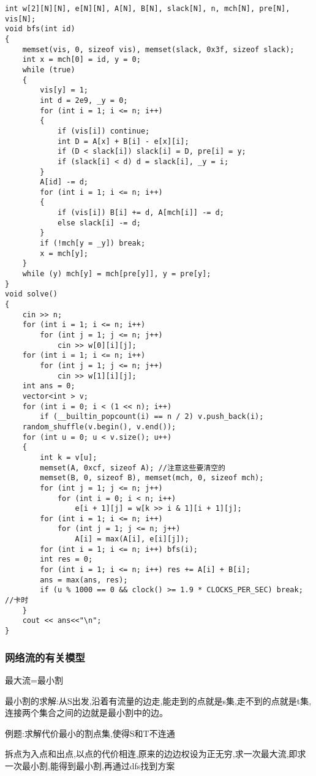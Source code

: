 \documentclass[a4paper, fontset=none]{ctexart}
\begin{document}
\begin{verbatim}
int w[2][N][N], e[N][N], A[N], B[N], slack[N], n, mch[N], pre[N], vis[N];
void bfs(int id)
{
    memset(vis, 0, sizeof vis), memset(slack, 0x3f, sizeof slack);
    int x = mch[0] = id, y = 0;
    while (true)
    {
        vis[y] = 1;
        int d = 2e9, _y = 0;
        for (int i = 1; i <= n; i++)
        {
            if (vis[i]) continue;
            int D = A[x] + B[i] - e[x][i];
            if (D < slack[i]) slack[i] = D, pre[i] = y;
            if (slack[i] < d) d = slack[i], _y = i;
        }
        A[id] -= d;
        for (int i = 1; i <= n; i++)
        {
            if (vis[i]) B[i] += d, A[mch[i]] -= d;
            else slack[i] -= d;
        }
        if (!mch[y = _y]) break;
        x = mch[y];
    }
    while (y) mch[y] = mch[pre[y]], y = pre[y];
}
void solve()
{
    cin >> n;
    for (int i = 1; i <= n; i++)
        for (int j = 1; j <= n; j++)
            cin >> w[0][i][j];
    for (int i = 1; i <= n; i++)
        for (int j = 1; j <= n; j++)
            cin >> w[1][i][j];
    int ans = 0;
    vector<int > v;
    for (int i = 0; i < (1 << n); i++)
        if (__builtin_popcount(i) == n / 2) v.push_back(i);
    random_shuffle(v.begin(), v.end());
    for (int u = 0; u < v.size(); u++)
    {
        int k = v[u];
        memset(A, 0xcf, sizeof A); //注意这些要清空的
        memset(B, 0, sizeof B), memset(mch, 0, sizeof mch);
        for (int j = 1; j <= n; j++)
            for (int i = 0; i < n; i++)
                e[i + 1][j] = w[k >> i & 1][i + 1][j];
        for (int i = 1; i <= n; i++)
            for (int j = 1; j <= n; j++)
                A[i] = max(A[i], e[i][j]);
        for (int i = 1; i <= n; i++) bfs(i);
        int res = 0;
        for (int i = 1; i <= n; i++) res += A[i] + B[i];
        ans = max(ans, res);
        if (u % 1000 == 0 && clock() >= 1.9 * CLOCKS_PER_SEC) break; //卡时
    }
    cout << ans<<"\n";
}
\end{verbatim}
\subsubsection{网络流的有关模型}

最大流=最小割

最小割的求解:从S出发,沿着有流量的边走,能走到的点就是s集,走不到的点就是t集,连接两个集合之间的边就是最小割中的边。

例题:求解代价最小的割点集,使得S和T不连通

拆点为入点和出点,以点的代价相连,原来的边边权设为正无穷,求一次最大流,即求一次最小割,能得到最小割,再通过dfs找到方案
\end{document}
